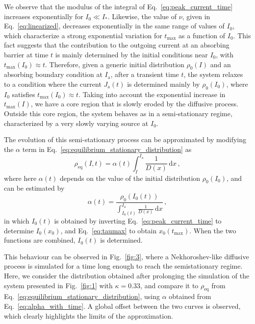 {We observe that the modulus of the integral of Eq.~\eqref{eq:peak_current_time} increases exponentially for $I_0 \ll I_\ast$. Likewise, the value of $\nu$, given in Eq.~\eqref{eq:linearized}, decreases exponentially in the same range of values of $I_0$, which characterize a strong exponential variation for $t_\text{max}$ as a function of $I_0$. This fact suggests that the contribution to the outgoing current at an absorbing barrier at time $t$ is mainly determined by the initial conditions near $I_0$, with $t_\text{max}(I_0) \approx t$. Therefore, given a generic initial distribution $\rho_0(I)$ and an absorbing boundary condition at $I_\mathrm{a}$, after a transient time $t$, the system relaxes to a condition where the current $J_\mathrm{a}(t)$ is determined mainly by $\rho_0(I_0)$, where $I_0$ satisfies $t_\text{max}(I_0) \approx t$. Taking into account the exponential increase in $t_\text{max}(I)$, we have a core region that is slowly eroded by the diffusive process. Outside this core region, the system behaves as in a semi-stationary regime, characterized by a very slowly varying source at $I_0$.

The evolution of this semi-stationary process can be approximated by modifying the $\alpha$ term in Eq.~\eqref{eq:equilibrium_stationary_distribution} as
\begin{equation}
    \rho_\mathrm{eq}(I, t) = \alpha(t) \int_I^{I_\mathrm{a}} \frac{1}{D(x)}\,\mathrm{d}x\,,
    \label{eq:semi_stationary_distribution}
\end{equation}
where here $\alpha(t)$ depends on the value of the initial distribution $\rho_0(I_0)$, and can be estimated by
\begin{equation}
    \alpha(t) = \frac{\rho_0\left(I_0(t)\right)}{\displaystyle{ \int_{I_0(t)}^{I_\mathrm{a}} \frac{1}{D(x)}\,\mathrm{d}x}}\,,
    \label{eq:alpha_with_time}
\end{equation}
in which $I_0(t)$ is obtained by inverting Eq.~\eqref{eq:peak_current_time} to determine $I_0(x_0)$, and Eq.~\eqref{eq:taumax} to obtain $x_0(t_\mathrm{max})$. When the two functions are combined, $I_0(t)$ is determined.

This behaviour can be observed in Fig.~\ref{fig:3}, where a Nekhoroshev-like diffusive process is simulated for a time long enough to reach the semistationary regime. Here, we consider the distribution obtained after prolonging the simulation of the system presented in Fig.~\ref{fig:1} with $\kappa=0.33$, and compare it to $\rho_\mathrm{eq}$ from Eq.~\eqref{eq:equilibrium_stationary_distribution}, using $\alpha$ obtained from Eq.~\eqref{eq:alpha_with_time}. A global offset between the two curves is observed, which clearly highlights the limits of the approximation. 

}
